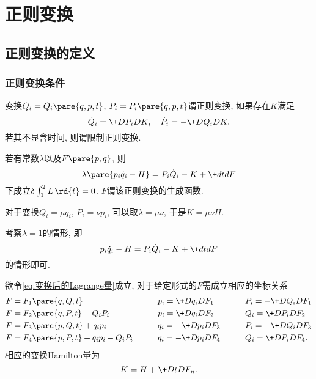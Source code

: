 \documentclass[../TheoreticalMechanics.tex]{subfiles}
\begin{document}
\section{正则变换} %
\label{sec:正则变换}

\subsection{正则变换的定义} %
\label{sub:正则变换的定义}

\subsubsection{正则变换条件} %
\label{ssub:正则变换条件}

\begin{definition}[正则变换]
    变换$Q_i = Q_i\pare{q,p,t}$, $P_i = P_i\pare{q,p,t}$谓正则变换, 如果存在$K$满足
    \[ \dot{Q}_i = \+D{P_i}DK,\quad \dot{P}_i = -\+D{Q_i}DK. \]
    若其不显含时间, 则谓限制正则变换.
\end{definition}
\begin{lemma}[正则变换后的作用量]
    若有常数$\lambda$以及$F\pare{p,q}$, 则
    \[ \lambda\pare{p_i\dot{q}_i-H} = P_i\dot{Q}_i - K + \+dtdF \]
    下成立$\delta \int_1^2 L\,\rd{t} = 0$. $F$谓该正则变换的生成函数.
\end{lemma}
\begin{ex}
    对于变换$Q_i = \mu q_i$, $P_i = \nu p_i$, 可以取$\lambda = \mu\nu$, 于是$K = \mu\nu H$.
\end{ex}
\begin{remark}
    考察$\lambda = 1$的情形, 即
    \begin{equation}
        \label{eq:变换后的Lagrange量}
        p_i\dot{q}_i - H = P_i\dot{Q}_i - K + \+dtdF 
    \end{equation}
    的情形即可.
\end{remark}
\begin{finale}
    \begin{theorem}[正则变换的生成函数]
        欲令\eqref{eq:变换后的Lagrange量}成立, 对于给定形式的$F$需成立相应的坐标关系
        \begin{alignat*}{3}
            & F = F_1 \pare{q,Q,t} \qquad && p_i = \+D{q_i}D{F_1} \qquad && P_i = -\+D{Q_i}D{F_1} \\
            & F = F_2 \pare{q,P,t} - Q_iP_i\qquad && p_i = \+D{q_i}D{F_2} \qquad && Q_i = \+D{P_i}D{F_2} \\
            & F = F_3\pare{p,Q,t} + q_ip_i \qquad && q_i = -\+D{p_i}D{F_3} \qquad && P_i = -\+D{Q_i}D{F_3} \\
            & F = F_4\pare{p,P,t} + q_ip_i - Q_iP_i \qquad && q_i = -\+D{p_i}D{F_4} \qquad && Q_i = \+D{P_i}D{F_4}.
        \end{alignat*}
        相应的变换Hamilton量为
        \begin{equation}
            \label{eq:正则变换下的Hamilton量}
            K = H + \+DtD{F_n}. 
        \end{equation}
    \end{theorem}
\end{finale}
\end{document}
